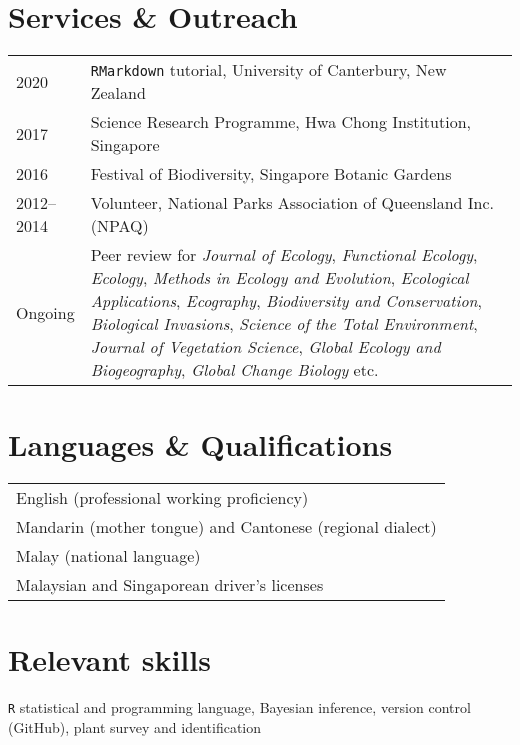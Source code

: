 \documentclass[a4paper]{article}
\begin{document}
\section*{Services \& Outreach}
\begin{tabular}{p{0.13\linewidth} p{0.87\linewidth}}
2020 & \texttt{RMarkdown} tutorial, University of Canterbury, New Zealand \\
2017 & Science Research Programme, Hwa Chong Institution, Singapore \\
2016 & Festival of Biodiversity, Singapore Botanic Gardens \\
2012--2014 & Volunteer, National Parks Association of Queensland Inc. (NPAQ) \\
Ongoing & Peer review for \textit{Journal of Ecology}, \textit{Functional Ecology}, \textit{Ecology}, \textit{Methods in Ecology and Evolution}, \textit{Ecological Applications}, \textit{Ecography}, \textit{Biodiversity and Conservation}, \textit{Biological Invasions}, \textit{Science of the Total Environment}, \textit{Journal of Vegetation Science}, \textit{Global Ecology and Biogeography}, \textit{Global Change Biology} etc.\\
\end{tabular}


\section*{Languages \& Qualifications}
\begin{tabular}{p{\linewidth}}
English (professional working proficiency) \\
Mandarin (mother tongue) and Cantonese (regional dialect) \\
Malay (national language) \\
Malaysian and Singaporean driver's licenses \\
\end{tabular}


\section*{Relevant skills}
\texttt{R} statistical and programming language, Bayesian inference, version control (GitHub), plant survey and identification
\end{document}
